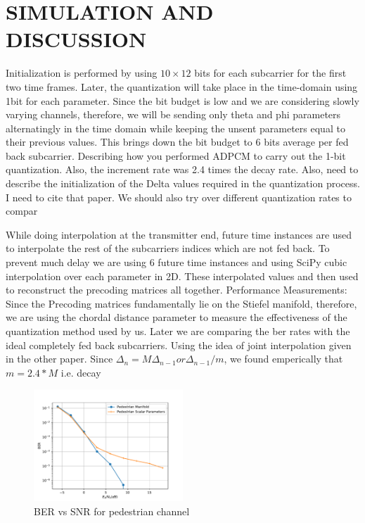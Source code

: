 \documentclass[conference]{IEEEtran}
\begin{document}
\section{SIMULATION AND DISCUSSION}
\label{section3}

Initialization is performed by using $10 \times 12$ bits for each subcarrier for the first two time frames. Later, the quantization will take place in the time-domain using 1bit for each parameter. Since the bit budget is low and we are considering slowly varying channels, therefore, we will be sending only theta and phi parameters alternatingly in the time domain while keeping the unsent parameters equal to their previous values. This brings down the bit budget to 6 bits average per fed back subcarrier.
Describing how you performed ADPCM to carry out the 1-bit quantization. Also, the increment rate was 2.4 times the decay rate. Also, need to describe the initialization of the Delta values required in the quantization process. I need to cite that paper. We should also try over different quantization rates to compar \cite{Gupt1905}

While doing interpolation at the transmitter end, future time instances are used to interpolate the rest of the subcarriers indices which are not fed back. To prevent much delay we are using 6 future time instances and using SciPy cubic interpolation over each parameter in 2D. These interpolated values and then used to reconstruct the precoding matrices all together.
Performance Measurements:
Since the Precoding matrices fundamentally lie on the Stiefel manifold, therefore, we are using the chordal distance parameter to measure the effectiveness of the quantization method used by us. Later we are comparing the ber rates with the ideal completely fed back subcarriers.
Using the idea of joint interpolation given in the other paper.
Since $\Delta_{n} = M\Delta_{n-1} or \Delta_{n-1}/m $, we found emperically that $m=2.4*M$ i.e. decay

\begin{figure}
\includegraphics[width=0.5\textwidth]{images/pedestrian.pdf}

\caption{BER vs SNR for pedestrian channel}
\label{ber_overview}
\vspace{-5pt}
\end{figure}
\end{document}
